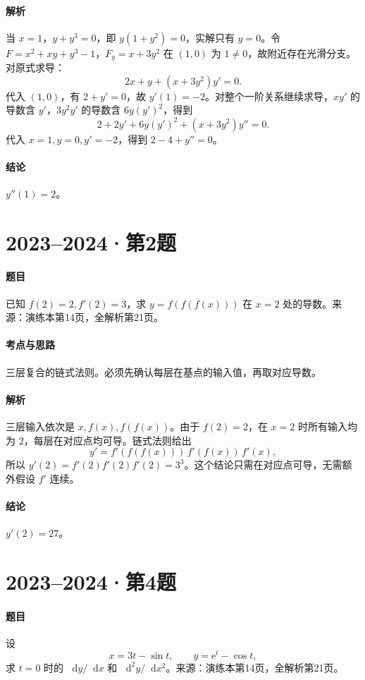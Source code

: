 \documentclass[UTF8,fontset=fandol,12pt,oneside,openany]{ctexrep}
\newcommand{\dd}{\mathop{}\!\mathrm d}
\newcommand{\ee}{\mathrm e}
\theoremstyle{definition}
\begin{document}
\paragraph{解析}当 $x=1$，$y+y^3=0$，即 $y(1+y^2)=0$，实解只有 $y=0$。令 $F=x^2+xy+y^3-1$，$F_y=x+3y^2$ 在 $(1,0)$ 为 $1\ne0$，故附近存在光滑分支。对原式求导：
\[
 2x+y+(x+3y^2)y'=0.
\]
代入 $(1,0)$，有 $2+y'=0$，故 $y'(1)=-2$。对整个一阶关系继续求导，$xy'$ 的导数含 $y'$，$3y^2y'$ 的导数含 $6y(y')^2$，得到
\[
 2+2y'+6y(y')^2+(x+3y^2)y''=0.
\]
代入 $x=1,y=0,y'=-2$，得到 $2-4+y''=0$。
\paragraph{结论}$y''(1)=2$。

\par\addvspace{18pt}\noindent\begin{minipage}{\linewidth}
\section{2023--2024·第2题}
\paragraph{题目}已知 $f(2)=2,f'(2)=3$，求 $y=f(f(f(x)))$ 在 $x=2$ 处的导数。来源：演练本第14页，全解析第21页。
\end{minipage}\par
\paragraph{考点与思路}三层复合的链式法则。必须先确认每层在基点的输入值，再取对应导数。
\paragraph{解析}三层输入依次是 $x,f(x),f(f(x))$。由于 $f(2)=2$，在 $x=2$ 时所有输入均为 $2$，每层在对应点均可导。链式法则给出
\[
 y'=f'(f(f(x)))\,f'(f(x))\,f'(x),
\]
所以 $y'(2)=f'(2)f'(2)f'(2)=3^3$。这个结论只需在对应点可导，无需额外假设 $f'$ 连续。
\paragraph{结论}$y'(2)=27$。

\par\addvspace{18pt}\noindent\begin{minipage}{\linewidth}
\section{2023--2024·第4题}
\paragraph{题目}设
\[
 x=3t-\sin t,\qquad y=\ee^t-\cos t,
\]
求 $t=0$ 时的 $\dd y/\dd x$ 和 $\dd^2y/\dd x^2$。来源：演练本第14页，全解析第21页。
\end{minipage}\par
\end{document}
